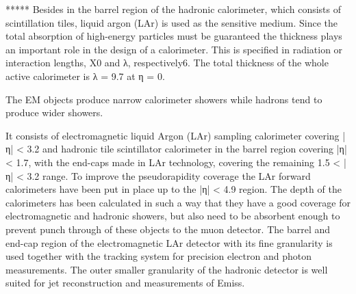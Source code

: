 *****
Besides in the barrel region of the hadronic calorimeter, which consists of scintillation tiles, liquid argon (LAr) is used as the sensitive medium.  Since the total absorption of high-energy particles must be guaranteed the thickness plays an important role in the design of a calorimeter.
This is specified in radiation or interaction lengths, X0 and λ, respectively6. 
The total thickness of the whole active calorimeter is λ = 9.7 at η = 0. 

The EM objects produce narrow calorimeter showers while hadrons tend to produce wider showers.

It consists of electromagnetic liquid Argon (LAr) sampling calorimeter covering |η| < 3.2 and hadronic tile scintillator calorimeter in the barrel region covering |η| < 1.7, with the end-caps made in LAr technology, covering the remaining 1.5 < |η| < 3.2 range. 
To improve the pseudorapidity coverage the LAr forward calorimeters have been put in place up to the |η| < 4.9 region. 
The depth of the calorimeters has been calculated in such a way that they have a good coverage for electromagnetic and hadronic showers, but also need to be absorbent enough to prevent punch through of these objects to the muon detector. 
The barrel and end-cap region of the electromagnetic LAr detector with its fine granularity is used together with the tracking system for precision electron and photon measurements. 
The outer smaller granularity of the hadronic detector is well suited for jet reconstruction and measurements of Emiss.


